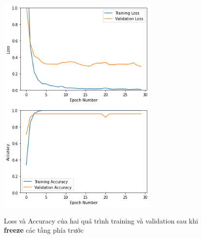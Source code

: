 \documentclass[a4paper]{article}
\begin{document}
\begin{figure}[h!]
\centering
{{\includegraphics[width=8cm]{images/loss1.png} }}
\qquad
{{\includegraphics[width=8cm]{images/acc1.png} }}
\caption*{Loss và Accuracy của hai quá trình training và validation sau khi \textbf{freeze} các tầng phía trước}
\end{figure}
\end{document}
